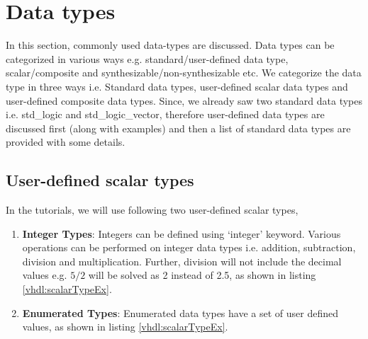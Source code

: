 \section{Data types}
In this section, commonly used data-types are discussed. Data types can be categorized in various ways e.g. standard/user-defined data type, scalar/composite and synthesizable/non-synthesizable etc. We categorize the data type in three ways i.e. Standard data types, user-defined scalar data types and user-defined composite data types. Since, we already saw two standard data types i.e. std\_logic and std\_logic\_vector, therefore user-defined data types are discussed first (along with examples) and then a list of standard data types are provided with some details. 

\subsection{User-defined scalar types}
In the tutorials, we will use following two user-defined scalar types, 
\begin{enumerate}
	\item \textbf{Integer Types}: Integers can be defined using `integer' keyword. Various operations can be performed on integer data types i.e. addition, subtraction, division and multiplication. Further, division will not include the decimal values e.g. $5/2$ will be solved as 2 instead of 2.5, as shown in listing \ref {vhdl:scalarTypeEx}.
	
	\item \textbf{Enumerated Types}: Enumerated data types have a set of user defined values, as shown in listing \ref {vhdl:scalarTypeEx}. 
	
\end{enumerate} 

